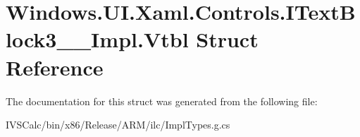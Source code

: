 \hypertarget{struct_windows_1_1_u_i_1_1_xaml_1_1_controls_1_1_i_text_block3_____impl_1_1_vtbl}{}\section{Windows.\+U\+I.\+Xaml.\+Controls.\+I\+Text\+Block3\+\_\+\+\_\+\+Impl.\+Vtbl Struct Reference}
\label{struct_windows_1_1_u_i_1_1_xaml_1_1_controls_1_1_i_text_block3_____impl_1_1_vtbl}


The documentation for this struct was generated from the following file\+:\begin{DoxyCompactItemize}
\item 
I\+V\+S\+Calc/bin/x86/\+Release/\+A\+R\+M/ilc/Impl\+Types.\+g.\+cs\end{DoxyCompactItemize}
